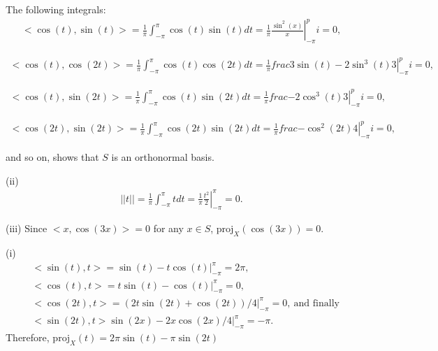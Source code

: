 \documentclass[11.5pt, letterpaper, bibtotoc,
    tablecaptionabove, figurecaptionabove]{article}
\begin{document}
The following integrals:
\begin{align*}
    <\cos(t),\sin(t)> = \frac{1}{\pi}\int_{-\pi}^\pi\cos(t)\sin(t)dt=
    \frac{1}{\pi}\left.\frac{\sin^2(x)}{x}\right\lvert_{-\pi}^pi=0,
\end{align*}

\begin{align*}
    <\cos(t),\cos(2t)> = \frac{1}{\pi}\int_{-\pi}^\pi\cos(t)\cos(2t)dt=
    \frac{1}{\pi}\left.frac{3\sin(t)-2\sin^3(t)}{3}\right\lvert_{-\pi}^pi=0,
\end{align*}

\begin{align*}
    <\cos(t),\sin(2t)> = \frac{1}{\pi}\int_{-\pi}^\pi\cos(t)\sin(2t)dt=
    \frac{1}{\pi}\left.frac{-2\cos^3(t)}{3}\right\lvert_{-\pi}^pi=0,
\end{align*}

\begin{align*}
    <\cos(2t),\sin(2t)> = \frac{1}{\pi}\int_{-\pi}^\pi\cos(2t)\sin(2t)dt=
    \frac{1}{\pi}\left.frac{-\cos^2(2t)}{4}\right\lvert_{-\pi}^pi=0,
\end{align*}

and so on, shows that $S$ is an orthonormal basis.

(ii)
\begin{align*}
    ||t|| = \frac{1}{\pi}\int_{-\pi}^\pi tdt=
    \frac{1}{\pi}\left.\frac{t^2}{2}\right\lvert_{-\pi}^\pi=0.
\end{align*}

(iii)
Since $<x,\cos(3x)>=0$ for any $x\in S$, $\text{proj}_X(\cos(3x))=0$.

(i)
\begin{align*}
    &<\sin(t),t>=\sin(t)-t\cos(t)\lvert_{-\pi}^\pi=2\pi,\\
    &<\cos(t),t>=t\sin(t)-\cos(t)\lvert_{-\pi}^\pi=0,\\
    &<\cos(2t),t>=(2t\sin(2t)+\cos(2t))/4\lvert_{-\pi}^\pi=0,\ \text{and finally}\\
    &<\sin(2t),t>\sin\left(2x\right)-2x\cos\left(2x\right)/4\lvert_{-\pi}^\pi=-\pi.
\end{align*}
Therefore, $\text{proj}_X(t)=2\pi\sin(t)-\pi\sin(2t)$
\end{document}
